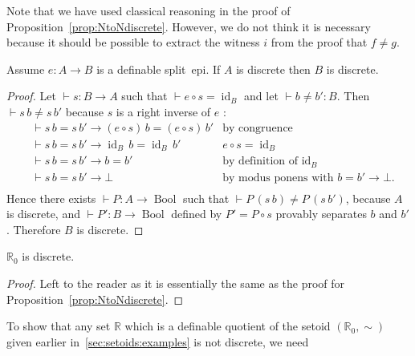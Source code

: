 \documentclass[envcountsame]{llncs}
\newcommand{\R}{\mathbb{R}}
\DeclareMathOperator{\Bool}{Bool}
\DeclareMathOperator{\id}{id}
\begin{document}
Note that we have used classical reasoning in the proof of Proposition~\ref{prop:NtoNdiscrete}. However, we do not think it is necessary because it should be possible to extract the witness $i$ from the proof that $f\neq g$.

\begin{proposition}\label{prop:splitepidiscrete}
Assume $ e\colon A\to B$ is a definable split~epi.  If $A$ is discrete then $B$ is discrete.
\end{proposition}
\begin{proof}
Let $\vdash s\colon B\to A$ such that $\vdash e \circ s=\id_B$ and let $\vdash b\neq b'\colon B$. Then $\vdash s\,b\neq s\,b'$ because  $s$ is a right inverse of $e$ :
\begin{align*}
&\vdash s\,b = s\,b'\to (e\circ s)\, b = (e\circ s)\,b'&\text{by congruence}  \\
&\vdash s\,b = s\,b'\to \id_B\, b = \id_B\,b'&e\circ s = \id_B  \\
&\vdash s\,b = s\,b'\to b = b'&\text{by definition of $\id_B$}\\
&\vdash s\,b = s\,b'\to \bot&\text{by modus ponens with $b=b'\to\bot.$}\\
\end{align*}Hence there exists $\vdash P\colon A\to\Bool$ such that $\vdash P\,(s\,b)\neq P\,(s\,b')$, because $A$ is discrete, and  $\vdash P'\colon B\to\Bool$ defined by $P' = P\circ s$ provably separates $b$ and $b'$.
Therefore $B$ is discrete.
\end{proof}

\begin{proposition}\label{prop:RZdiscrete}
 $\R_0$ is discrete.
\end{proposition}
\begin{proof}
Left to the reader as it is essentially the same as the proof for Proposition~\ref{prop:NtoNdiscrete}.
\end{proof}
To show that any set $\R$ which is a definable quotient of the setoid $(\R_0,\sim)$ given earlier in~\ref{sec:setoids:examples} is not discrete, we need
\end{document}
